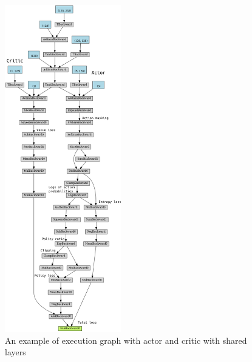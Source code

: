 \documentclass[11pt, a4paper, hidelinks]{report}
\begin{document}
\begin{figure}
\centering
\includegraphics[width=0.45\textwidth]{resources/psppo_shared_graph_commented.png}
\caption{An example of execution graph with actor and critic with shared layers}
\label{fig:psppo_shared_graph_commented}
\end{figure}
\end{document}
